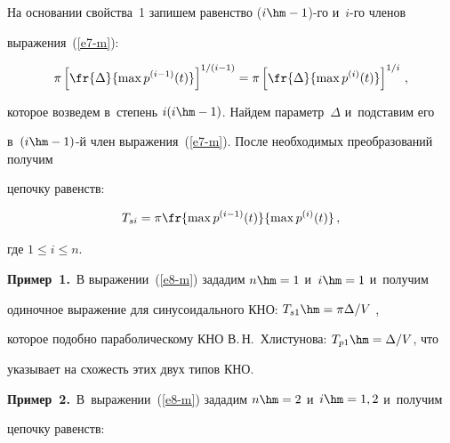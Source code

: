   


  \smallskip


  


  На основании свойства~1 запишем равенство ($i\hm-1$)-го и~$i$-го членов 


выражения~(\ref{e7-m}):


  $$


  \pi \left[ \fr{\Delta}{\max p^{(i-1)}(t)}\right]^{1/(i-1)}=\pi \left[ \fr{\Delta}{\max 


p^{(i)}(t)}\right]^{1/i}\,,


  $$


  которое возведем в~степень $i(i\hm-1)$. Найдем параметр~$\Delta$ и~подставим его 


в~\mbox{$(i\hm-1)$-й} член выражения~(\ref{e7-m}). После необходимых преобразований получим 


цепочку равенств:


  \begin{equation}


  T_{si}=\pi \fr{\max p^{(i-1)}(t)}{ \max p^{(i)}(t)}\,,


  \label{e8-m}


  \end{equation}


где $1\leq i\leq n$.





\smallskip





\noindent


\textbf{Пример~1.}\ В выражении~(\ref{e8-m}) зададим $n\hm=1$ и~$i\hm=1$ и~получим 


одиночное выражение для синусоидального КНО: $T_{s1}\hm=\pi \Delta/V$ , 


которое подобно параболическому КНО В.\,Н.~Хлистунова: $T_{p1}\hm=\Delta/V$, что 


указывает на схожесть этих двух типов КНО.





\smallskip





\noindent


\textbf{Пример~2.}\ В~выражении~(\ref{e8-m}) зададим $n\hm=2$ и~$i\hm=1,2$ и~получим 


цепочку равенств: 


$$



